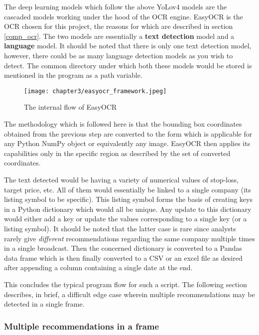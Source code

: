 The deep learning models which follow the above YoLov4 models are the cascaded models working under the hood of the OCR engine. EasyOCR is the OCR chosen for this project, the reasons for which are described in section \ref{comp_ocr}. The two models are essentially a \textbf{text detection} model and a \textbf{language} model. It should be noted that there is only one text detection model, however, there could be as many language detection models as you wish to detect. The common directory under which both these models would be stored is mentioned in the program as a path variable.

\begin{figure}[h]
  \centering
  \texttt{[image: chapter3/easyocr\_framework.jpeg]}
  \caption{The internal flow of EasyOCR}
  \label{fig:internal_ocr}
\end{figure}

The methodology which is followed here is that the bounding box coordinates obtained from the previous step are converted to the form {} which is applicable for any Python NumPy object or equivalently any image. EasyOCR then applies its capabilities only in the specific region as described by the set of converted coordinates. \par

The text detected would be having a variety of numerical values of stop-loss, target price, etc. All of them would essentially be linked to a single company (its listing symbol to be specific). This listing symbol forms the basis of creating keys in a Python dictionary which would all be unique. Any update to this dictionary would either add a key or update the values corresponding to a single key (or a listing symbol). It should be noted that the latter case is rare since analysts rarely give \textit{different} recommendations regarding the same company multiple times in a single broadcast. Then the concerned dictionary is converted to a Pandas data frame which is then finally converted to a CSV or an excel file as desired after appending a column containing a single date at the end. \par

This concludes the typical program flow for such a script. The following section describes, in brief, a difficult edge case wherein multiple recommendations may be detected in a single frame.

\subsubsection{Multiple recommendations in a frame}

